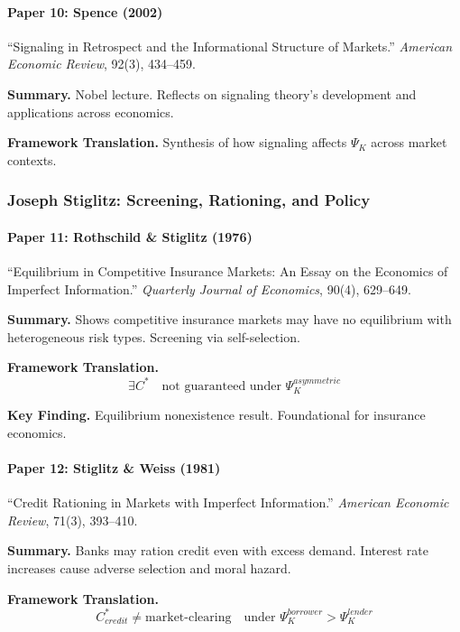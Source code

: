\paragraph{Paper 10: Spence (2002)}

``Signaling in Retrospect and the Informational Structure of Markets.''
\textit{American Economic Review}, 92(3), 434--459.

\textbf{Summary.}
Nobel lecture. Reflects on signaling theory's development and applications 
across economics.

\textbf{Framework Translation.}
Synthesis of how signaling affects $\Psi_K$ across market contexts.

\subsubsection{Joseph Stiglitz: Screening, Rationing, and Policy}

\paragraph{Paper 11: Rothschild \& Stiglitz (1976)}

``Equilibrium in Competitive Insurance Markets: An Essay on the Economics 
of Imperfect Information.''
\textit{Quarterly Journal of Economics}, 90(4), 629--649.

\textbf{Summary.}
Shows competitive insurance markets may have no equilibrium with heterogeneous 
risk types. Screening via self-selection.

\textbf{Framework Translation.}
\begin{equation}
\exists C^* \quad \text{not guaranteed under } \Psi_K^{asymmetric}
\end{equation}

\textbf{Key Finding.}
Equilibrium nonexistence result. Foundational for insurance economics.

\paragraph{Paper 12: Stiglitz \& Weiss (1981)}

``Credit Rationing in Markets with Imperfect Information.''
\textit{American Economic Review}, 71(3), 393--410.

\textbf{Summary.}
Banks may ration credit even with excess demand. Interest rate increases 
cause adverse selection and moral hazard.

\textbf{Framework Translation.}
\begin{equation}
C^*_{credit} \neq \text{market-clearing} \quad \text{under } \Psi_K^{borrower} > \Psi_K^{lender}
\end{equation}

